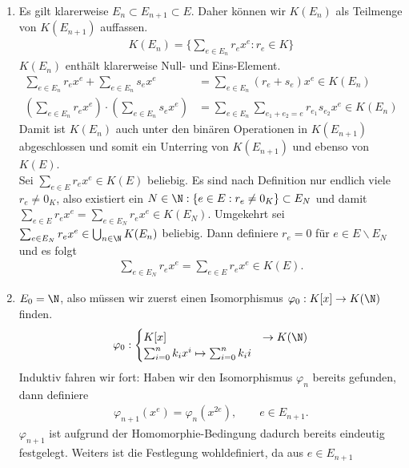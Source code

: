 \begin{solution}
\leavevmode \\
\begin{enumerate}
  \item Es gilt klarerweise $E_n \subset E_{n+1} \subset E$. Daher können wir $K(E_n)$
  als Teilmenge von $K(E_{n+1})$ auffassen.
  \begin{align*}
    K(E_n) = \{\sum_{e \in E_n}r_ex^e: r_e \in K\}
  \end{align*}
  $K(E_n)$ enthält klarerweise Null- und Eins-Element.
  \begin{align*}
    \sum_{e \in E_n}r_ex^e + \sum_{e \in E_n}s_ex^e &= \sum_{e \in E_n}(r_e + s_e)x^e \in K(E_n) \\
    \left(\sum_{e \in E_n}r_ex^e\right)\cdot\left(\sum_{e \in E_n}s_ex^e\right) &=
    \sum_{e \in E_n}\sum_{e_1 + e_2 = e}r_{e_1}s_{e_2}x^e \in K(E_n)
  \end{align*}
  Damit ist $K(E_n)$ auch unter den binären Operationen in $K(E_{n+1})$
  abgeschlossen und somit ein Unterring von $K(E_{n+1})$ und ebenso von $K(E)$. \\
  Sei $\sum_{e \in E}r_ex^e \in K(E)$ beliebig. Es sind nach Definition nur endlich
  viele $r_e \neq 0_K$, also existiert ein $N \in \N: \{e \in E: r_e \neq 0_K\} \subset E_N$
  und damit $\sum_{e \in E}r_ex^e = \sum_{e \in E_N}r_ex^e \in K(E_N)$.
  Umgekehrt sei $\sum_{e \in E_N}r_ex^e \in \bigcup_{n \in \N}K(E_n)$ beliebig.
  Dann definiere $r_e = 0$ für $e \in E\backslash E_N$ und es folgt
  \begin{align*}
    \sum_{e \in E_N}r_ex^e = \sum_{e \in E}r_ex^e \in K(E).
  \end{align*}
  \item $E_0 = \N$, also müssen wir zuerst einen Isomorphismus $\varphi_0: K[x] \to K(\N)$
  finden.
  \begin{align*}
    \varphi_0: \begin{cases}
      K[x] &\to K(\N) \\
      \sum_{i = 0}^nk_ix^i \mapsto \sum_{i = 0}^nk_ii
    \end{cases}
  \end{align*}
  Induktiv fahren wir fort: Haben wir den Isomorphismus $\varphi_n$ bereits gefunden,
  dann definiere
  \begin{align*}
    \varphi_{n+1}(x^e) = \varphi_n(x^{2e}), \qquad e \in E_{n+1}.
  \end{align*}
  $\varphi_{n+1}$ ist aufgrund der Homomorphie-Bedingung dadurch bereits eindeutig
  festgelegt. Weiters ist die Festlegung wohldefiniert, da aus $e \in E_{n+1}$

\end{enumerate}
\end{solution}
